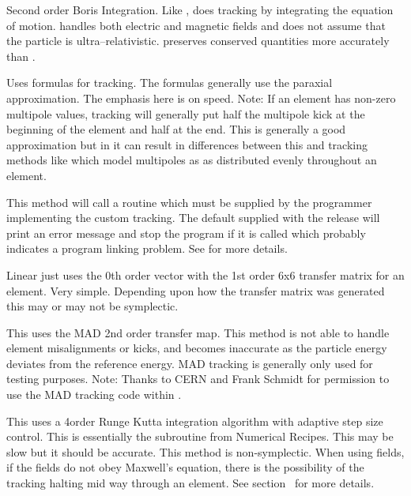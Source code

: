 \begin{description}

\item[\vn{Boris}]
Second order Boris Integration\cite{b:boris}. Like ,
 does tracking by integrating the equation of
motion.  handles both electric and magnetic fields and does
not assume that the particle is ultra--relativistic.  preserves
conserved quantities more accurately than .

\item[\vn{Bmad_Standard}]
Uses formulas for tracking. The formulas generally use the paraxial
approximation.  The emphasis here is on speed. Note: If an element has
non-zero multipole values,  tracking will generally
put half the multipole kick at the beginning of the element and half
at the end. This is generally a good approximation but in it can
result in differences between this and tracking methods like
 which model multipoles as as distributed evenly
throughout an element.

\item[\vn{Custom}]
This method will call a routine  which must be
supplied by the programmer implementing the custom tracking. The
default  supplied with the \bmad release will print
an error message and stop the program if it is called which probably
indicates a program linking problem. See  for more details.

\item[\vn{Linear}]
Linear just uses the 0th order vector with the 1st order 6x6 transfer
matrix for an element. Very simple.  Depending upon how the transfer
matrix was generated this may or may not be symplectic.

\item[\vn{MAD}]
This uses the MAD 2nd order transfer map. This method is not able to
handle element misalignments or kicks, and becomes inaccurate as the
particle energy deviates from the reference energy. MAD tracking is
generally only used for testing purposes. Note: Thanks to CERN and
Frank Schmidt for permission to use the MAD tracking code within
\bmad.

\item[\vn{runge_kutta}]
This uses a 4\Th order Runge Kutta integration algorithm with adaptive
step size control.  This is essentially the  subroutine
from Numerical Recipes\cite{b:nr}. This may be slow but it should be
accurate. This method is non-symplectic.  When using
 fields, if the fields do not obey Maxwell's equation,
there is the possibility of the  tracking halting mid
way through an element. See section~ for more details.


\end{description}
